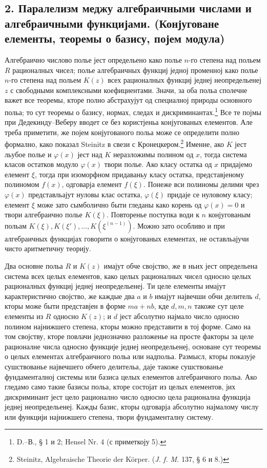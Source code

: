 ﻿\documentclass[11pt]{article}
\begin{document}
\subsection*{2. Паралелизм меджу алгебраичными числами и алгебраичными функцијами. (Конјуговане елементы, теоремы о базису, појем модула)}
Алгебраично числово полье јест определьено како полье \(n\)-го степена над польем \(R\) рационалных чисел; полье алгебраичных функциј једној променној како полье \(n\)-го степена над польем \(K(z)\) всех рационалных функциј једнеј неопредельенеј \(z\) с свободными комплексными коефициентами. Значи, за оба польа сполечне важет все теоремы, кторе полно абстрахујут од специалној природы основного польа; то сут теоремы о базису, нормах, следах и дискриминантах.\footnote{D.--В., § 1 и 2; Hensel Nr. 4 (с приметкоју 5).} Все те појмы при Дедекинду--Веберу вводет се без користјеньа конјугованых елементов. Але треба приметити, же појем конјугованого польа може се определити полно формално, како показал Steinitz в свези с Кронецкером.\footnote{Steinitz, Algebraische Theorie der Körper. (\emph{J. f. M.} 137, § 6 и 8.)} Именне, ако \(K\) јест льубое полье и \(\varphi(x)\) јест над \(K\) неразложимы полином од \(x\), тогда система класов остатков модуло \(\varphi(x)\) твори полье. Ако класу остатка од \(x\) придајемо елемент \(\xi\), тогда при изоморфном придаваньу класу остатка, представјеному полиномом \(f(x)\), одговарја елемент \(f(\xi)\). Понеже вси полиномы делими чрез \(\varphi(x)\) представльајут нуловы клас остатка, \(\varphi(\xi)\) придаје се нуловому класу; елемент \(\xi\) може зато сымболично быти гледаны како корень од \(\varphi(x)=0\) и твори алгебраично полье \(K(\xi)\). Повторенье поступка води к \(n\) конјугованым польам \(K(\xi), K(\xi'),\ldots,K(\xi^{(n-1)})\). Можно зато особливо и при алгебраичных функцијах говорити о конјугованых елементах, не оставльајучи чисто аритметичну теорију.

Два основне польа \(R\) и \(K(z)\) имајут обче својство, же в ньих јест определьена система всех целых елементов, како целых рационалных чисел односно целых рационалных функциј једнеј неопредельенеј. Ти целе елементы имајут карактеристично својство, же каждые два \(a\) и \(b\) имајут највечши обчи делитель \(d\), кторы може быти представјен в форме \(ma+nb\), кде \(d,m,n\) такоже сут целе елементы из \(R\) односно \(K(z)\); и \(d\) јест абсолутно најмало число односно полином најнижшего степена, кторы можно представити в тој форме. Само на том својству, кторе повлачи једнозначно разложенье на просте факторы за целе рационалне числа односно функције једнеј неопредельенеј, основане сут теоремы о целых елементах алгебраичного польа или надпольа. Размысл, кторы показује сушствованье највечшего обчего делительа, даје такоже сушствованье фундаменталној системы или базиса целых елементов алгебраичного польа. Ако гледамо само такие базисы польа, кторе состојат из целых елементов, јих дискриминант јест цело рационално число односно цела рационална функција једнеј неопредельенеј. Кажды базис, кторы одговарја абсолутно најмалому числу или функцији најнижшего степена, твори фундаменталну систему.
\end{document}
